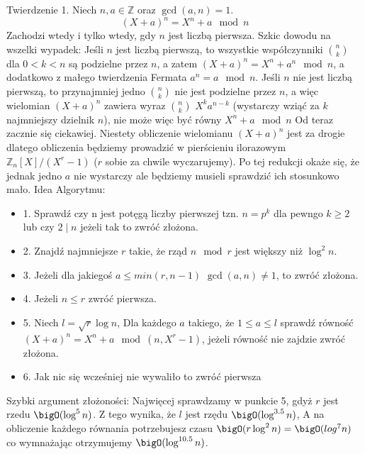 Twierdzenie 1. \newline
Niech $n,a \in \mathbb{Z}$ oraz $\gcd(a,n) = 1$.
$$(X + a)^n = X^n + a \mod n$$
Zachodzi wtedy i tylko wtedy, gdy $n$ jest liczbą pierwsza.
\newline
Szkic dowodu na wszelki wypadek: \newline \newline
Jeśli $n$ jest liczbą pierwszą, to wszystkie współczynniki $n \choose k$ dla $0 < k < n$ są podzielne przez $n$, a zatem $(X + a)^n = X^n + a^n \mod n$, a dodatkowo z małego twierdzenia Fermata $a^n = a \mod n$. Jeśli $n$ nie jest liczbą pierwszą, to przynajmniej jedno $n \choose k$ nie jest podzielne przez $n$, a więc wielomian $(X + a)^n$ zawiera wyraz
$n \choose k$ $X^ka^{n-k}$ (wystarczy wziąć za $k$ najmniejszy dzielnik $n$), nie może więc być równy $X^n + a \mod n$
\newline \newline
Od teraz zacznie się ciekawiej. Niestety obliczenie wielomianu $(X + a)^n$ jest za drogie dlatego obliczenia będziemy prowadzić w pierścieniu ilorazowym $\mathbb{Z}_n[X]/(X^r - 1)$ ($r$ sobie za chwile wyczarujemy). Po tej redukcji okaże się, że jednak jedno $a$ nie wystarczy ale będziemy musieli sprawdzić ich stosunkowo mało.
\newline \newline
Idea Algorytmu:
\begin{itemize}
    \item 1. Sprawdź czy n jest potęgą liczby pierwszej tzn. $n = p^k$ dla pewngo $k \geq 2$ lub czy $2 \mid n$ jeżeli tak to zwróć złożona.
    \item 2. Znajdź najmniejsze $r$ takie, że rząd $n \mod r$ jest większy niż $\log^2 n$.
    \item 3. Jeżeli dla jakiegoś $a \leq min(r,n-1)$ $\gcd(a,n) \neq 1$,  to zwróć złożona.
    \item 4. Jeżeli $n \leq r$ zwróć pierwsza.
    \item 5. Niech $l = \sqrt{r} \log n$, Dla każdego $a$ takiego, że $1 \leq a \leq l$ sprawdź równość $(X + a)^n = X^n + a \mod (n,X^r - 1)$, jeżeli równość nie zajdzie zwróć złożona.
    \item 6. Jak nic się wcześniej nie wywaliło to zwróć pierwsza

\end{itemize}

Szybki argument złożoności:\newline
Najwięcej sprawdzamy w punkcie 5, gdyż $r$ jest rzedu $\bigO(\log^5 n)$. Z tego wynika, że $l$ jest rzędu $\bigO(\log^{3.5} n)$, A na obliczenie każdego równania potrzebujesz czasu $\bigO(r \log^2 n) = \bigO(log^7 n)$ co wymnażając otrzymujemy $\bigO(\log^{10.5} n)$.
